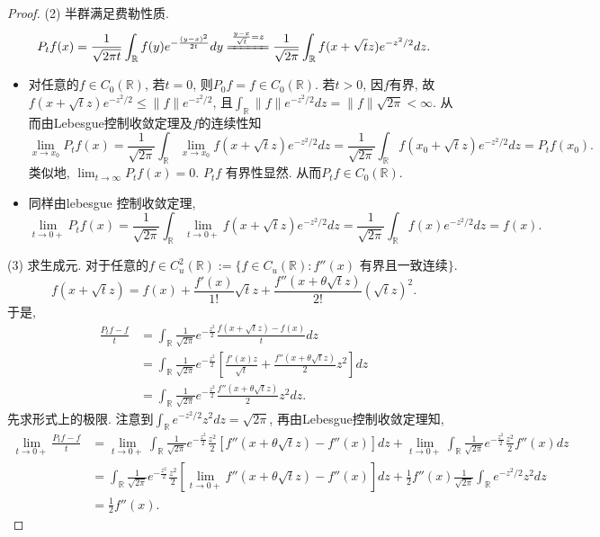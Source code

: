\documentclass[UTF8,ondside]{ctexart}
\newcommand{\kx}{\mathbb}
\numberwithin{equation}{section}
\begin{document}
\begin{proof}
		(2) 半群满足费勒性质.
		\[
			P_t f(x) =\frac{1}{\sqrt{2\pi t}} \int_{\kx R} f(y) e^{-\frac{(y-x)^2}{2t}}dy
			\xlongequal{\frac{y-x}{\sqrt{t}}=z}\frac{1}{\sqrt{2\pi}} \int_{\kx R} f(x+\sqrt{t}z) e^{-z^2/2} dz.
		\]
		\begin{itemize}
			\item 对任意的$f\in C_0(\kx R)$, 若$t=0$, 则$P_0 f=f\in C_0(\kx R)$. 若$t>0$, 因$f$有界, 故 $f(x+\sqrt{t}z)e^{-z^2/2}\leq \|f\| e^{- z^2/2}$, 且$\int_{\kx R}\|f\| e^{-z^2/2}dz = \|f\|\sqrt{2\pi}<\infty$. 从而由Lebesgue控制收敛定理及$f$的连续性知
			\[
				\lim_{x\rightarrow x_0}P_t f(x) =\frac{1}{\sqrt{2\pi}}\int_{\kx R}\lim_{x\rightarrow x_0} f(x+\sqrt{t}z) e^{-z^2/2} dz = \frac{1}{\sqrt{2\pi}}\int_{\kx R}f(x_0+\sqrt{t}z) e^{-z^2/2} dz=P_t f(x_0).
			\] 类似地, $\lim_{t\rightarrow \infty} P_t f(x)= 0$. $P_t f$ 有界性显然. 从而$P_t f\in C_0(\kx R)$.
			\item 同样由lebesgue 控制收敛定理, \[
				\lim_{t\rightarrow 0+}P_t f(x) =\frac{1}{\sqrt{2\pi}}\int_{\kx R}\lim_{t\rightarrow 0+} f(x+\sqrt{t}z) e^{-z^2/2} dz = \frac{1}{\sqrt{2\pi}}\int_{\kx R}f(x) e^{-z^2/2} dz= f(x).
			\]
		\end{itemize}

		(3) 求生成元. 对于任意的$f\in C_u^2(\kx R):=\{f\in C_u(\kx R):f''(x) \text{ 有界且一致连续}\}$.
		\[
			f(x+\sqrt{t}z) = f(x) + \frac{f'(x)}{1!} \sqrt{t}z + \frac{f''(x+\theta\sqrt{t}z)}{2!}(\sqrt{t}z)^2.
		\]
		于是, 
		\[
			\begin{aligned}
			\frac{P_t f-f}{t} &= \int_{\kx R} \frac{1}{\sqrt{2\pi}} e^{- \frac{z^2}{2}} \frac{f(x+\sqrt{t}z)-f(x)}{t} dz\\
			&= \int_{\kx R} \frac{1}{\sqrt{2\pi}} e^{- \frac{z^2}{2}}
			\left[
				\frac{f'(x)z}{\sqrt{t}}+\frac{f''(x+\theta\sqrt{t}z)}{2}z^2
			\right]dz\\
			&= \int_{\kx R} \frac{1}{\sqrt{2\pi}} e^{- \frac{z^2}{2}}
				\frac{f''(x+\theta\sqrt{t}z)}{2}z^2 dz.
		\end{aligned}
		\]
		先求形式上的极限. 注意到$\int_{\kx R} e^{- z^2/2} z^2 dz = \sqrt{2\pi}$, 再由Lebesgue控制收敛定理知,
		\[
		\begin{aligned}
			\lim_{t\rightarrow 0+}\frac{P_t f-f}{t} &= \lim_{t\rightarrow 0+} \int_{\kx R} \frac{1}{\sqrt{2\pi}} e^{- \frac{z^2}{2}} \frac{z^2}{2} [f''(x+\theta\sqrt{t}z)-f''(x)]dz + \lim_{t\rightarrow 0+} \int_{\kx R} \frac{1}{\sqrt{2\pi}} e^{- \frac{z^2}{2}} \frac{z^2}{2} f''(x)dz\\
			&=\int_{\kx R} \frac{1}{\sqrt{2\pi}} e^{- \frac{z^2}{2}} \frac{z^2}{2} \left[\lim_{t\rightarrow 0+} f''(x+\theta\sqrt{t}z)-f''(x)\right]dz + \frac{1}{2}f''(x) \frac{1}{\sqrt{2\pi}}\int_{\kx R} e^{- z^2/2} z^2 dz\\
			&= \frac{1}{2}f''(x).
		\end{aligned}
		\]


\end{proof}
\end{document}
